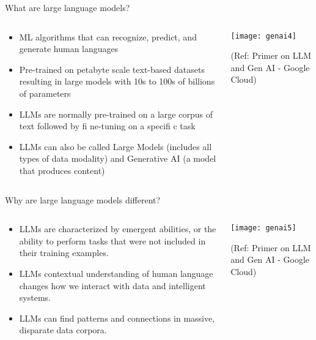 \begin{frame}[fragile]{What are large language models?}
\begin{columns}
    \begin{column}[T]{0.6\linewidth}
  \begin{itemize}
    \item ML algorithms that can recognize, predict, and generate human languages
    \item Pre-trained on petabyte scale text-based datasets resulting in large models with 10s to 100s of billions of parameters 
    \item LLMs are normally pre-trained on a large corpus of text followed by fi ne-tuning on a specifi c task
    \item LLMs can also be called Large Models (includes all types of data modality) and Generative AI (a model that produces content)
  \end{itemize}
    \end{column}
    \begin{column}[T]{0.4\linewidth}  
\begin{center}
\texttt{[image: genai4]}
\end{center}
{\tiny (Ref: Primer on LLM and Gen AI - Google Cloud)}

    \end{column}
  \end{columns}
  
  
\end{frame}

\begin{frame}[fragile]{Why are large language models different? }
\begin{columns}
    \begin{column}[T]{0.6\linewidth}
  \begin{itemize}
    \item LLMs are characterized by emergent abilities, or the ability to perform tasks that were not included in their training examples.
    \item LLMs contextual understanding of human language changes how we interact with data and intelligent systems.
	\item LLMs can find patterns and connections in massive, disparate data corpora.
  \end{itemize}
    \end{column}
    \begin{column}[T]{0.4\linewidth}  
\begin{center}
\texttt{[image: genai5]}
\end{center}
{\tiny (Ref: Primer on LLM and Gen AI - Google Cloud)}

    \end{column}
  \end{columns}
  
  
\end{frame}


